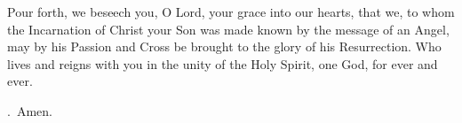 \lettrine[lines=3]{P}{}our forth, we beseech you, O Lord,
your grace into our hearts,
that we, to whom the Incarnation of Christ your Son
was made known by the message of an Angel,
may by his Passion and Cross
be brought to the glory of his Resurrection.
Who lives and reigns with you in the unity of the Holy Spirit,
one God, for ever and ever. \par \Rbar.~Amen.
